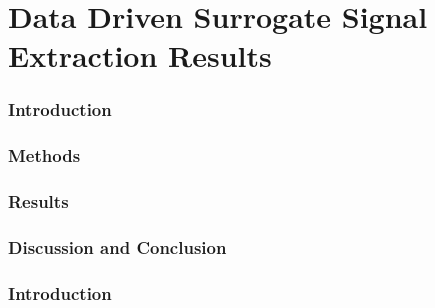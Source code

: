 \chapter{Data Driven Surrogate Signal Extraction Results} \label{sec:data_driven_surrogate_signal_extraction_results}
            
    
        
        
        \subsection{Introduction} \label{sec:extension_of_static_pca_based_data_driven_surrogate_signal_extraction_to_dynamic_pet_introduction}
        
        \subsection{Methods} \label{sec:extension_of_static_pca_based_data_driven_surrogate_signal_extraction_to_dynamic_pet_methods}
            
            
        \subsection{Results} \label{sec:extension_of_static_pca_based_data_driven_surrogate_signal_extraction_to_dynamic_pet_results}
            
            
        \subsection{Discussion and Conclusion} \label{sec:extension_of_static_pca_based_data_driven_surrogate_signal_extraction_to_dynamic_pet_discussion_and_conclusion}
            
    
        
        
        \subsection{Introduction} \label{sec:feasibility_of_neural_network_based_data_driven_surrogate_signal_extraction_methods_for_dynamic_pet_introduction}
        
